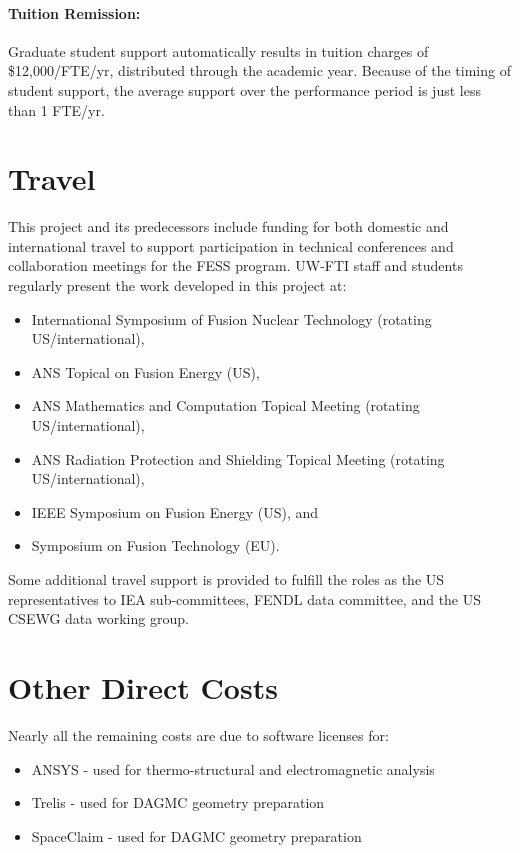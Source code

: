 \paragraph{Tuition Remission:} Graduate student support automatically results
in tuition charges of \$12,000/FTE/yr, distributed through the academic year.
Because of the timing of student support, the average support over the
performance period is just less than 1 FTE/yr.

\section{Travel}

This project and its predecessors include funding for both domestic and
international travel to support participation in technical conferences and
collaboration meetings for the \gls{FESS} program. \gls{UW-FTI} staff and
students regularly present the work developed in this project at:
\begin{itemize}
\item International Symposium of Fusion Nuclear Technology (rotating US/international),
\item ANS Topical on Fusion Energy (US),
\item ANS Mathematics and Computation Topical Meeting (rotating US/international),
\item ANS Radiation Protection and Shielding Topical Meeting (rotating
  US/international),
\item IEEE Symposium on Fusion Energy (US), and
\item Symposium on Fusion Technology (EU).
\end{itemize}

Some additional travel support is provided to fulfill the roles as the US
representatives to IEA sub-committees, FENDL data committee, and the US
\gls{CSEWG} data working group.

\section{Other Direct Costs}

Nearly all the remaining costs are due to software licenses for:
\begin{itemize}
\item ANSYS - used for thermo-structural and electromagnetic analysis
\item Trelis - used for DAGMC geometry preparation
\item SpaceClaim - used for DAGMC geometry preparation
\end{itemize}

